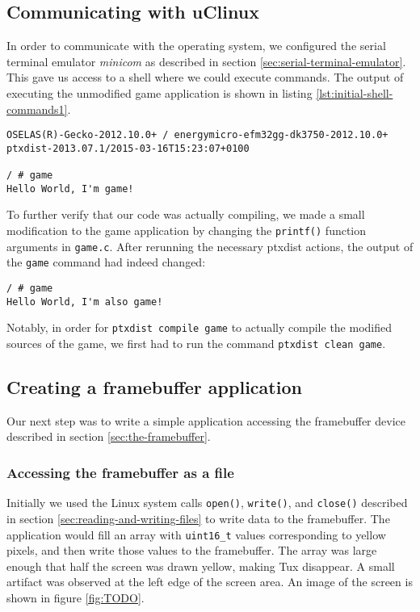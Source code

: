\subsection{Communicating with uClinux}
In order to communicate with the operating system, we configured the serial terminal emulator \emph{minicom} as described in section \ref{sec:serial-terminal-emulator}. This gave us access to a shell where we could execute commands. The output of executing the unmodified game application is shown in listing \ref{lst:initial-shell-commands1}.
\lstset{style=lststyle-terminal}
\begin{lstlisting}[caption=The original game application,label=lst:initial-shell-commands1]
OSELAS(R)-Gecko-2012.10.0+ / energymicro-efm32gg-dk3750-2012.10.0+
ptxdist-2013.07.1/2015-03-16T15:23:07+0100

/ # game
Hello World, I'm game!
\end{lstlisting}

To further verify that our code was actually compiling, we made a small modification to the game application by changing the \texttt{printf()} function arguments in \texttt{game.c}. After rerunning the necessary ptxdist actions, the output of the \texttt{game} command had indeed changed:
\lstset{style=lststyle-terminal}
\begin{lstlisting}[caption=A modified game application,label=lst:initial-shell-commands2]
/ # game
Hello World, I'm also game!
\end{lstlisting}
Notably, in order for \texttt{ptxdist compile game} to actually compile the modified sources of the game, we first had to run the command \texttt{ptxdist clean game}.

\subsection{Creating a framebuffer application}
Our next step was to write a simple application accessing the framebuffer device described in section \ref{sec:the-framebuffer}.

\subsubsection{Accessing the framebuffer as a file}
Initially we used the Linux system calls \texttt{open()}, \texttt{write()}, and \texttt{close()} described in section \ref{sec:reading-and-writing-files} to write data to the framebuffer. The application would fill an array with \texttt{uint16\_t} values corresponding to yellow pixels, and then write those values to the framebuffer. The array was large enough that half the screen was drawn yellow, making Tux disappear. A small artifact was observed at the left edge of the screen area. An image of the screen is shown in figure \ref{fig:TODO}.

